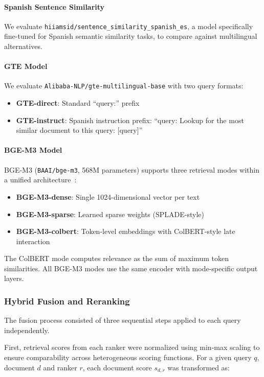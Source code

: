 \documentclass[preprint,12pt]{elsarticle}
\begin{document}
\paragraph{Spanish Sentence Similarity}
We evaluate \texttt{hiiamsid/sentence\_similarity\_spanish\_es}, a model specifically fine-tuned for Spanish semantic similarity tasks, to compare against multilingual alternatives.

\paragraph{GTE Model}
We evaluate \texttt{Alibaba-NLP/gte-multilingual-base} with two query formats:
\begin{itemize}
    \item \textbf{GTE-direct}: Standard ``query:'' prefix
    \item \textbf{GTE-instruct}: Spanish instruction prefix: ``query: Lookup for the most similar document to this query: [query]''
\end{itemize}

\paragraph{BGE-M3 Model}
BGE-M3 (\texttt{BAAI/bge-m3}, 568M parameters) supports three retrieval modes within a unified architecture~\citep{chen2024bge}:
\begin{itemize}
    \item \textbf{BGE-M3-dense}: Single 1024-dimensional vector per text
    \item \textbf{BGE-M3-sparse}: Learned sparse weights (SPLADE-style)
    \item \textbf{BGE-M3-colbert}: Token-level embeddings with ColBERT-style late interaction
\end{itemize}
The ColBERT mode computes relevance as the sum of maximum token similarities. All BGE-M3 modes use the same encoder with mode-specific output layers.

\subsubsection{Hybrid Fusion and Reranking}
\label{subsec:hybrid_fusion}

The fusion process consisted of three sequential steps applied to each query independently.

First, retrieval scores from each ranker were normalized using min-max scaling to ensure comparability across heterogeneous scoring functions. For a given query $q$, document $d$ and ranker $r$, each document score $s_{d,r}$ was transformed as:
\end{document}
